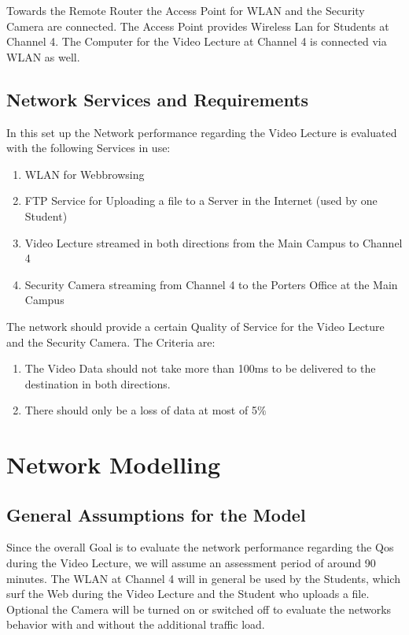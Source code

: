 \documentclass[a4paper,10pt]{book}
\begin{document}
Towards the Remote Router the Access Point for WLAN and the Security Camera are connected.
The Access Point provides Wireless Lan for Students at Channel 4. The Computer for the Video Lecture at Channel 4 
is connected via WLAN as well.



\section{Network Services and Requirements}

In this set up the Network performance regarding the Video Lecture is evaluated with the following Services in
use:\\
\begin{enumerate}
 \item WLAN for Webbrowsing
 \item FTP Service for Uploading a file to a Server in the Internet (used by one Student) 
 \item Video Lecture streamed in both directions from the Main Campus to Channel 4
 \item Security Camera streaming from Channel 4 to the Porters Office  at the Main Campus
\end{enumerate}

The network should provide a certain Quality of Service for the Video Lecture and the Security Camera.
The Criteria are:\\
\begin{enumerate}
 \item The Video Data should not take more than 100ms to be delivered to the destination in both directions.
 \item There should only be a loss of data at most of 5$ \% $
\end{enumerate}

\chapter{Network Modelling}
\section{General Assumptions for the Model}
Since the overall Goal is to evaluate the network performance regarding the Qos during the Video Lecture, we will assume an assessment period
of around 90 minutes. The WLAN at Channel 4 will in general be used by the Students, which surf the Web during the Video Lecture and the Student 
who uploads a file. Optional the Camera will be turned on or switched off to evaluate the networks behavior with and without the additional
traffic load.
\end{document}
